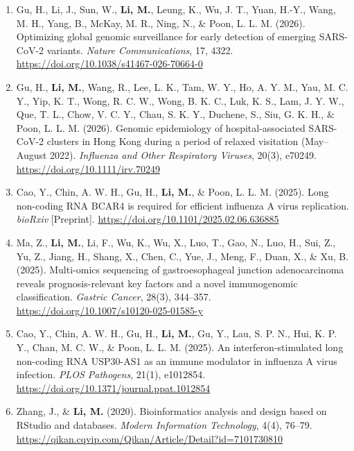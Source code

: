 \documentclass[11pt, a4paper]{awesome-cv}
\begin{document}
\begin{cvparagraph}
\begin{enumerate}[leftmargin=1.1cm, labelsep=0.5cm, align=left, itemsep=1.6mm, topsep=0pt, label=\arabic*.]
  \item Gu, H., Li, J., Sun, W., \textbf{Li, M.}, Leung, K., Wu, J. T., Yuan, H.-Y., Wang, M. H., Yang, B., McKay, M. R., Ning, N., \& Poon, L. L. M. (2026). Optimizing global genomic surveillance for early detection of emerging SARS-CoV-2 variants. \textit{Nature Communications}, 17, 4322. \url{https://doi.org/10.1038/s41467-026-70664-0}

  \item Gu, H., \textbf{Li, M.}, Wang, R., Lee, L. K., Tam, W. Y., Ho, A. Y. M., Yau, M. C. Y., Yip, K. T., Wong, R. C. W., Wong, B. K. C., Luk, K. S., Lam, J. Y. W., Que, T. L., Chow, V. C. Y., Chau, S. K. Y., Duchene, S., Siu, G. K. H., \& Poon, L. L. M. (2026). Genomic epidemiology of hospital-associated SARS-CoV-2 clusters in Hong Kong during a period of relaxed visitation (May--August 2022). \textit{Influenza and Other Respiratory Viruses}, 20(3), e70249. \url{https://doi.org/10.1111/irv.70249}

  \item Cao, Y., Chin, A. W. H., Gu, H., \textbf{Li, M.}, \& Poon, L. L. M. (2025). Long non-coding RNA BCAR4 is required for efficient influenza A virus replication. \textit{bioRxiv} [Preprint]. \url{https://doi.org/10.1101/2025.02.06.636885}

  \item Ma, Z., \textbf{Li, M.}, Li, F., Wu, K., Wu, X., Luo, T., Gao, N., Luo, H., Sui, Z., Yu, Z., Jiang, H., Shang, X., Chen, C., Yue, J., Meng, F., Duan, X., \& Xu, B. (2025). Multi-omics sequencing of gastroesophageal junction adenocarcinoma reveals prognosis-relevant key factors and a novel immunogenomic classification. \textit{Gastric Cancer}, 28(3), 344--357. \url{https://doi.org/10.1007/s10120-025-01585-y}

  \item Cao, Y., Chin, A. W. H., Gu, H., \textbf{Li, M.}, Gu, Y., Lau, S. P. N., Hui, K. P. Y., Chan, M. C. W., \& Poon, L. L. M. (2025). An interferon-stimulated long non-coding RNA USP30-AS1 as an immune modulator in influenza A virus infection. \textit{PLOS Pathogens}, 21(1), e1012854. \url{https://doi.org/10.1371/journal.ppat.1012854}

  \item Zhang, J., \& \textbf{Li, M.} (2020). Bioinformatics analysis and design based on RStudio and databases. \textit{Modern Information Technology}, 4(4), 76--79. \url{https://qikan.cqvip.com/Qikan/Article/Detail?id=7101730810}
\end{enumerate}
\end{cvparagraph}

\label{acvlastpage}
\end{document}
